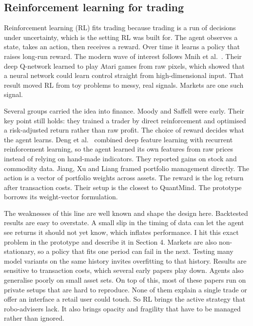 \documentclass[12pt,twoside,letterpaper]{article}
\begin{document}
\subsection{Reinforcement learning for trading}

Reinforcement learning (RL) fits trading because trading is a run of decisions under
uncertainty, which is the setting RL was built for. The agent observes a state,
takes an action, then receives a reward. Over time it learns a policy that raises
long-run reward. The modern wave of interest follows Mnih et al.\ \cite{mnih2015}.
Their deep Q-network learned to play Atari games from raw pixels, which showed that
a neural network could learn control straight from high-dimensional input. That
result moved RL from toy problems to messy, real signals. Markets are one such
signal.

Several groups carried the idea into finance. Moody and Saffell \cite{moody2001}
were early. Their key point still holds: they trained a trader by direct
reinforcement and optimised a risk-adjusted return rather than raw profit. The
choice of reward decides what the agent learns. Deng et al.\ \cite{deng2017}
combined deep feature learning with recurrent reinforcement learning, so the agent
learned its own features from raw prices instead of relying on hand-made
indicators. They reported gains on stock and commodity data. Jiang, Xu and Liang
\cite{jiang2017} framed portfolio management directly. The action is a vector of
portfolio weights across assets. The reward is the log return after transaction
costs. Their setup is the closest to QuantMind. The prototype borrows its
weight-vector formulation.

The weaknesses of this line are well known and shape the design here. Backtested
results are easy to overstate. A small slip in the timing of data can let the agent
see returns it should not yet know, which inflates performance. I hit this exact
problem in the prototype and describe it in Section 4. Markets are also
non-stationary, so a policy that fits one period can fail in the next. Testing many
model variants on the same history invites overfitting to that history. Results are
sensitive to transaction costs, which several early papers play down. Agents also
generalise poorly on small asset sets. On top of this, most of these papers run on
private setups that are hard to reproduce. None of them explain a single trade or
offer an interface a retail user could touch. So RL brings the active strategy that
robo-advisers lack. It also brings opacity and fragility that have to be managed
rather than ignored.
\end{document}
